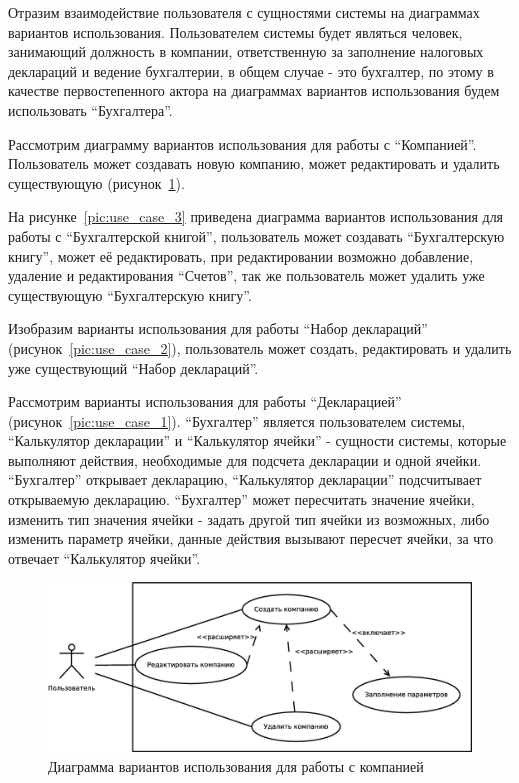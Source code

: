 \documentclass[14pt,a4paper]{reportmod}
\begin{document}
Отразим взаимодействие пользователя с сущностями системы на диаграммах вариантов использования. Пользователем системы будет являться человек, занимающий должность в компании, ответственную за заполнение налоговых деклараций и ведение бухгалтерии, в общем случае - это бухгалтер, по этому в качестве первостепенного актора на диаграммах вариантов использования будем использовать ``Бухгалтера''.

Рассмотрим диаграмму вариантов использования для работы с ``Компанией''. Пользователь может создавать новую компанию, может редактировать и удалить существующую (рисунок~\ref{pic:use_case_4}).

На рисунке~\ref{pic:use_case_3} приведена диаграмма вариантов использования для работы с ``Бухгалтерской книгой'', пользователь может создавать ``Бухгалтерскую книгу'', может её редактировать, при редактировании возможно добавление, удаление и редактирования ``Счетов'', так же пользователь может удалить уже существующую ``Бухгалтерскую книгу''.

Изобразим варианты использования для работы ``Набор деклараций'' (рисунок~\ref{pic:use_case_2}), пользователь может создать, редактировать и удалить уже существующий ``Набор деклараций''.

Рассмотрим варианты использования для работы ``Декларацией'' (рисунок~\ref{pic:use_case_1}). ``Бухгалтер'' является пользователем системы, ``Калькулятор декларации'' и ``Калькулятор ячейки'' - сущности системы, которые выполняют действия, необходимые для подсчета декларации и одной ячейки. ``Бухгалтер'' открывает декларацию, ``Калькулятор декларации'' подсчитывает открываемую декларацию. ``Бухгалтер'' может пересчитать значение ячейки, изменить тип значения ячейки - задать другой тип ячейки из возможных, либо изменить параметр ячейки, данные действия вызывают пересчет ячейки, за что отвечает ``Калькулятор ячейки''.

\begin{figure}
  \centering
  \includegraphics[scale=0.4]{uml/usecase_4}
  \caption{Диаграмма вариантов использования для работы с компанией}
  \label{pic:use_case_4}
\end{figure}
\end{document}
